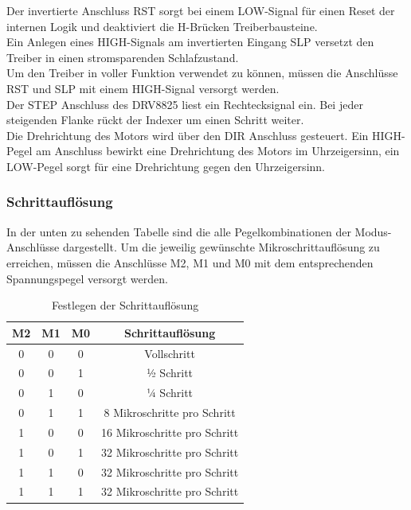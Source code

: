 Der invertierte Anschluss RST sorgt bei einem LOW-Signal für einen Reset der internen Logik und deaktiviert die H-Brücken Treiberbausteine. \\

Ein Anlegen eines HIGH-Signals am invertierten Eingang SLP versetzt den Treiber in einen stromsparenden Schlafzustand. \\

Um den Treiber in voller Funktion verwendet zu können, müssen die Anschlüsse RST und SLP mit einem HIGH-Signal versorgt werden. \\

Der STEP Anschluss des DRV8825 liest ein Rechtecksignal ein.
Bei jeder steigenden Flanke rückt der Indexer um einen Schritt weiter. \\

Die Drehrichtung des Motors wird über den DIR Anschluss gesteuert.
Ein HIGH-Pegel am Anschluss bewirkt eine Drehrichtung des Motors im Uhrzeigersinn, ein LOW-Pegel sorgt für eine Drehrichtung gegen den Uhrzeigersinn.

\subsubsection{Schrittauflösung}
In der unten zu sehenden Tabelle sind die alle Pegelkombinationen der Modus-Anschlüsse dargestellt.
Um die jeweilig gewünschte Mikroschrittauflösung zu erreichen, müssen die Anschlüsse M2, M1 und M0 mit dem entsprechenden Spannungspegel versorgt werden.

\begin{table}[h]
\centering
\begin{tabular}{|c|c|c|c|}
\hline
\textbf{M2} & \textbf{M1} & \textbf{M0} & \textbf{Schrittauflösung}    \\ \hline
0 & 0 & 0 & Vollschritt                  \\ \hline
0 & 0 & 1 & ½ Schritt                    \\ \hline
0 & 1 & 0 & ¼ Schritt                    \\ \hline
0 & 1 & 1 & 8 Mikroschritte pro Schritt  \\ \hline
1 & 0 & 0 & 16 Mikroschritte pro Schritt \\ \hline
1 & 0 & 1 & 32 Mikroschritte pro Schritt \\ \hline
1 & 1 & 0 & 32 Mikroschritte pro Schritt \\ \hline
1 & 1 & 1 & 32 Mikroschritte pro Schritt \\ \hline
\end{tabular}
\caption{Festlegen der Schrittauflösung}
\end{table}

